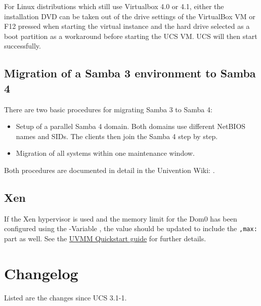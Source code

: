 For Linux distributions which still use Virtualbox 4.0 or 4.1, either
the installation DVD can be taken out of the drive settings of the
VirtualBox VM or F12 pressed when starting the virtual instance and
the hard drive selected as a boot partition as a workaround before
starting the UCS VM. UCS will then start successfully.

\section{Migration of a Samba 3 environment to Samba 4}
\label{samba-migration}

There are two basic procedures for migrating Samba 3 to Samba 4:

\begin{itemize}
\item Setup of a parallel Samba 4 domain. Both domains use different
NetBIOS names and SIDs. The clients then join the Samba 4 step by
step.
\item Migration of all systems within one maintenance window.
\end{itemize}

Both procedures are documented in detail in the Univention Wiki:
.

\section{Xen} %
If the Xen hypervisor is used and the memory limit for the Dom0 has been configured using the \ucsUCR{}-Variable , the value should be updated to include the \texttt{,max:} part as well.
See the \href{http://wiki.univention.de/index.php?title=UVMM_Quickstart-3.1/en#Configuring_the_Dom0}{UVMM Quickstart guide} for further details.

\chapter{Changelog}

Listed are the changes since UCS 3.1-1.






